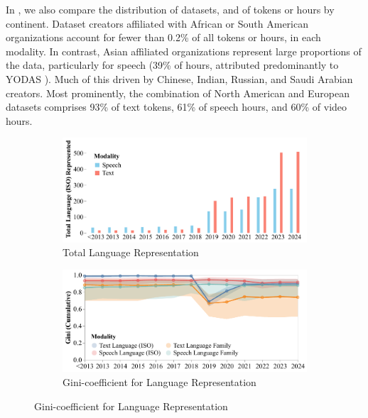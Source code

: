 In , we also compare the distribution of datasets, and of tokens or hours by continent. 
Dataset creators affiliated with African or South American organizations account for fewer than 0.2\% of all tokens or hours, in each modality.
In contrast, Asian affiliated organizations represent large proportions of the data, particularly for speech (39\% of hours, attributed predominantly to YODAS \citep{li2023yodas}).
Much of this driven by Chinese, Indian, Russian, and Saudi Arabian creators.
Most prominently, the combination of North American and European datasets comprises 93\% of text tokens, 61\% of speech hours, and 60\% of video hours.

\begin{figure}[htbp]
    \centering
    \begin{subfigure}[b]{0.49\textwidth}
        \centering
        \includegraphics[width=\linewidth]{figures/temporal-cumulative-languages.pdf} 
        \caption{Total Language Representation}
    \end{subfigure}
    \hfill
    \begin{subfigure}[b]{0.49\textwidth}
        \centering
        \includegraphics[width=\linewidth]{figures/temporal-language-gini.pdf} 
        \caption{Gini-coefficient for Language Representation}
    \end{subfigure}

    \vspace{0.3cm}


\end{figure}

